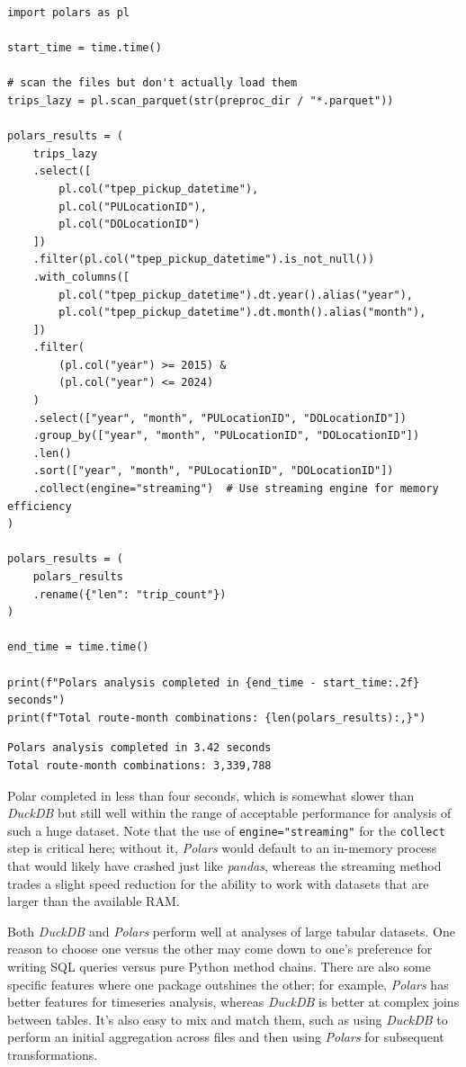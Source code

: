 \begin{lstlisting}[style=Python]
import polars as pl

start_time = time.time()

# scan the files but don't actually load them
trips_lazy = pl.scan_parquet(str(preproc_dir / "*.parquet"))

polars_results = (
    trips_lazy
    .select([
        pl.col("tpep_pickup_datetime"),
        pl.col("PULocationID"),
        pl.col("DOLocationID")
    ])
    .filter(pl.col("tpep_pickup_datetime").is_not_null())
    .with_columns([
        pl.col("tpep_pickup_datetime").dt.year().alias("year"),
        pl.col("tpep_pickup_datetime").dt.month().alias("month"),
    ])
    .filter(
        (pl.col("year") >= 2015) & 
        (pl.col("year") <= 2024) 
    )
    .select(["year", "month", "PULocationID", "DOLocationID"])
    .group_by(["year", "month", "PULocationID", "DOLocationID"])
    .len()
    .sort(["year", "month", "PULocationID", "DOLocationID"])
    .collect(engine="streaming")  # Use streaming engine for memory efficiency
)

polars_results = (
    polars_results
    .rename({"len": "trip_count"})
)

end_time = time.time()

print(f"Polars analysis completed in {end_time - start_time:.2f} seconds")
print(f"Total route-month combinations: {len(polars_results):,}")
\end{lstlisting}

\begin{lstlisting}[style=shellshort]
Polars analysis completed in 3.42 seconds
Total route-month combinations: 3,339,788
\end{lstlisting}

Polar completed in less than four seconds, which is somewhat slower than \textit{DuckDB} but still well within the range of acceptable performance for analysis of such a huge dataset. Note that the use of \texttt{engine="streaming"} for the \texttt{collect} step is critical here; without it, \textit{Polars} would default to an in-memory process that would likely have crashed just like \textit{pandas}, whereas the streaming method trades a slight speed reduction for the ability to work with datasets that are larger than the available RAM.

Both \textit{DuckDB} and \textit{Polars} perform well at analyses of large tabular datasets. One reason to choose one versus the other may come down to one's preference for writing SQL queries versus pure Python method chains.  There are also some specific features where one package outshines the other; for example, \textit{Polars} has better features for timeseries analysis, whereas \textit{DuckDB} is better at complex joins between tables.  It's also easy to mix and match them, such as using \textit{DuckDB} to perform an initial aggregation across files and then using \textit{Polars} for subsequent transformations.


